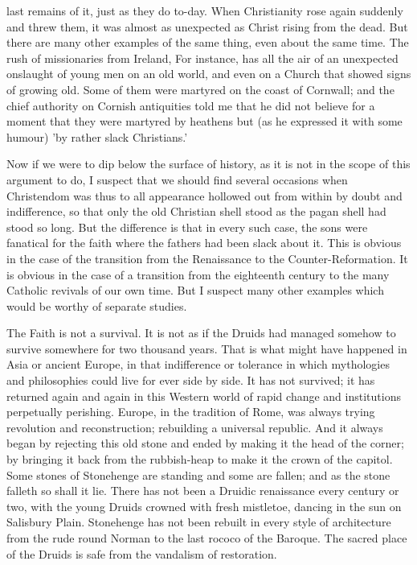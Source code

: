 last remains of it, just as they do to-day. When Christianity rose again suddenly and threw them, it was almost as unexpected as Christ rising from the dead. But there are many other examples of the same thing, even about the same time. The rush of missionaries from Ireland, For instance, has all the air of an unexpected onslaught of young men on an old world, and even on a Church that showed signs of growing old. Some of them were martyred on the coast of Cornwall; and the chief authority on Cornish antiquities told me that he did not believe for a moment that they were martyred by heathens but (as he expressed it with some humour) 'by rather slack Christians.'

Now if we were to dip below the surface of history, as it is not in the scope of this argument to do, I suspect that we should find several occasions when Christendom was thus to all appearance hollowed out from within by doubt and indifference, so that only the old Christian shell stood as the pagan shell had stood so long. But the difference is that in every such case, the sons were fanatical for the faith where the fathers had been slack about it. This is obvious in the case of the transition from the Renaissance to the Counter-Reformation. It is obvious in the case of a transition from the eighteenth century to the many Catholic revivals of our own time. But I suspect many other examples which would be worthy of separate studies.

The Faith is not a survival. It is not as if the Druids had managed somehow to survive somewhere for two thousand years. That is what might have happened in Asia or ancient Europe, in that indifference or tolerance in which mythologies and philosophies could live for ever side by side. It has not survived; it has returned again and again in this Western world of rapid change and institutions perpetually perishing. Europe, in the tradition of Rome, was always trying revolution and reconstruction; rebuilding a universal republic. And it always began by rejecting this old stone and ended by making it the head of the corner; by bringing it back from the rubbish-heap to make it the crown of the capitol. Some stones of Stonehenge are standing and some are fallen; and as the stone falleth so shall it lie. There has not been a Druidic renaissance every century or two, with the young Druids crowned with fresh mistletoe, dancing in the sun on Salisbury Plain. Stonehenge has not been rebuilt in every style of architecture from the rude round Norman to the last rococo of the Baroque. The sacred place of the Druids is safe from the vandalism of restoration.

